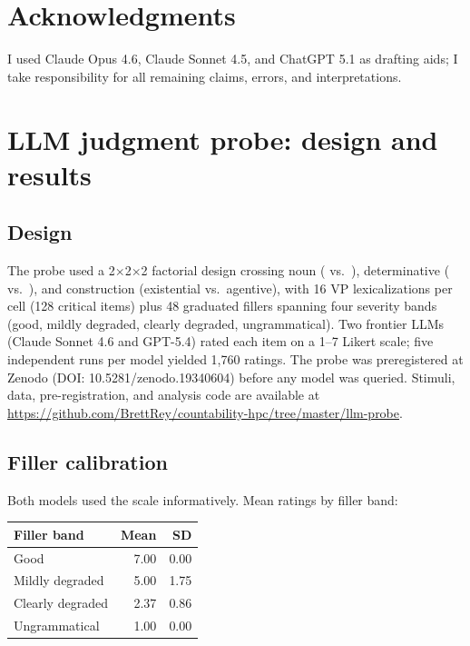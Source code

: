 \documentclass[12pt,a4paper]{article}
\begin{document}
\section*{Acknowledgments}

I used Claude Opus 4.6, Claude Sonnet 4.5, and ChatGPT 5.1 as drafting aids; I take responsibility for all remaining claims, errors, and interpretations.

\newpage

\printbibliography

\newpage
\appendix

\section{LLM judgment probe: design and results}\label{app:probe}

\subsection*{Design}

The probe used a 2$\times$2$\times$2 factorial design crossing noun ( vs.\ ), determinative ( vs.\ ), and construction (existential vs.\ agentive), with 16 VP lexicalizations per cell (128 critical items) plus 48 graduated fillers spanning four severity bands (good, mildly degraded, clearly degraded, ungrammatical). Two frontier LLMs (Claude Sonnet 4.6 and GPT-5.4) rated each item on a 1--7 Likert scale; five independent runs per model yielded 1{,}760 ratings. The probe was preregistered at Zenodo (DOI: 10.5281/zenodo.19340604) before any model was queried. Stimuli, data, pre-registration, and analysis code are available at \url{https://github.com/BrettRey/countability-hpc/tree/master/llm-probe}.

\subsection*{Filler calibration}

Both models used the scale informatively. Mean ratings by filler band:

\begin{table}[H]
\centering
\begin{tabular}{@{}l r r@{}}
\toprule
Filler band & Mean & SD \\
\midrule
Good          & 7.00 & 0.00 \\
Mildly degraded & 5.00 & 1.75 \\
Clearly degraded & 2.37 & 0.86 \\
Ungrammatical   & 1.00 & 0.00 \\
\bottomrule
\end{tabular}
\end{table}
\end{document}
